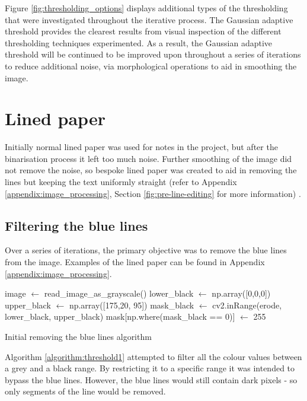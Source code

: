 Figure \ref{fig:thresholding_options} displays additional types of the thresholding that were investigated throughout the iterative process. The Gaussian adaptive threshold provides the clearest results from visual inspection of the different thresholding techniques experimented. As a result, the Gaussian adaptive threshold will be continued to be improved upon throughout a series of iterations to reduce additional noise, via morphological operations to aid in smoothing the image.

\section{Lined paper}
Initially normal lined paper was used for notes in the project, but after the binarisation process it left too much noise. Further smoothing of the image did not remove the noise, so bespoke lined paper was created to aid in removing the lines but keeping the text uniformly straight (refer to Appendix \ref{appendix:image_processing}, Section \ref{fig:pre-line-editing} for more information) .

\subsection{Filtering the blue lines}
Over a series of iterations, the primary objective was to remove the blue lines from the image. Examples of the lined paper can be found in Appendix \ref{appendix:image_processing}.

\begin{algorithm} [H]
\begin{algorithmic}[1]
    \State image $\gets$ read\_image\_as\_grayscale()
    \State lower\_black $\gets$ np.array([0,0,0])
    \State upper\_black $\gets$ np.array([175,20, 95])
    \State mask\_black $\gets$ cv2.inRange(erode, lower\_black, upper\_black)
    \State mask[np.where(mask\_black == 0)] $\gets$ 255
  \EndFunction
  \end{algorithmic}
  \caption{Initial removing the blue lines algorithm}
  \label{algorithm:threshold1}
\end{algorithm}

Algorithm \ref{algorithm:threshold1} attempted to filter all the colour values between a grey and a black range. By restricting it to a specific range it was intended to bypass the blue lines. However, the blue lines would still contain dark pixels - so only segments of the line would be removed.

